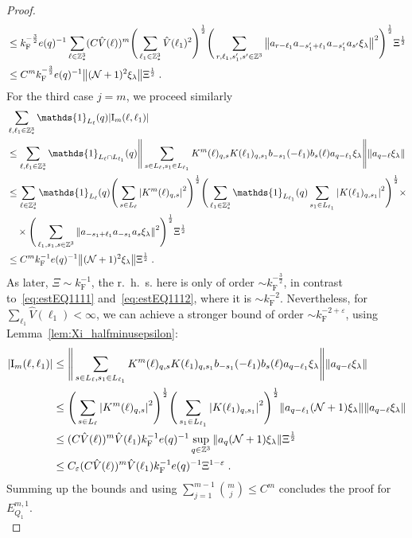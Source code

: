 \documentclass[12pt,a4paper]{article}
\numberwithin{equation}{section}
\newcommand{\1}{\mathbb{I}}
\newcommand{\F}{\mathrm{F}}
\newcommand{\I}{\mathrm{I}}
\newcommand{\Z}{\mathbb{Z}}
\newcommand{\NN}{\mathcal{N}}
\newcommand{\half}{\frac{1}{2}}
\theoremstyle{plain}
\theoremstyle{definition}
\theoremstyle{remark}
\theoremstyle{plain}
\theoremstyle{definition}
\theoremstyle{remark}
\begin{document}
\begin{proof}
\begin{align}
	&\leq k_{\F}^{-\frac 32} e(q)^{-1}
		\sum_{\ell \in \Z^3_*} (C \hat{V}(\ell))^m
		\Bigg( \sum_{\ell_1 \in \Z^3_*} \hat{V}(\ell_1)^2 \Bigg)^{\half} 
		\Bigg( \sum\limits_{r,\ell_1,s_1',s' \in \Z^3} \norm{a_{r-\ell_1} a_{-s_1'+\ell_1} a_{-s_1'} a_{s'} \xi_\lambda}^2 \Bigg)^\half
		\Xi^\half \nonumber\\
	&\leq C^m k_{\F}^{-\frac 32} e(q)^{-1}
		\norm{(\NN+1)^2 \xi_\lambda} \Xi^\half \;. \label{eq:estEQ1112}
\end{align}
For the third case $ j = m $, we proceed similarly
\begin{align}
	& \sum_{\ell,\ell_1 \in \Z^3_*} \mathds{1}_{L_\ell}(q) |\I_m(\ell, \ell_1)| \nonumber\\
	&\leq \sum_{\ell,\ell_1 \in \Z^3_*} \mathds{1}_{L_\ell \cap L_{\ell_1}}(q)
		\Bigg\Vert \sum\limits_{s\in L_{\ell}, s_1 \in L_{\ell_1}} K^m(\ell)_{q,s}K(\ell_1)_{q,s_1} b_{-s_1}(-\ell_1) b_{s}(\ell) a_{q-\ell_1}\xi_\lambda \Bigg\Vert
		\norm{ a_{q-\ell}\xi_\lambda }\nonumber\\
	&\leq \sum_{\ell \in \Z^3_*} \mathds{1}_{L_\ell}(q) \Bigg(\sum\limits_{s \in L_{\ell}} \abs{K^m(\ell)_{q,s}}^2\Bigg)^\half 
		\Bigg(\sum_{\ell_1 \in \Z^3_*} \mathds{1}_{L_{\ell_1}}(q) \sum\limits_{s_1 \in L_{\ell_1}} \abs{K(\ell_1)_{q,s_1}}^2\Bigg)^\half \times \nonumber\\
	&\quad \times \Bigg( \sum_{\ell_1, s_1, s \in \Z^3} \norm{ a_{-s_1+\ell_1} a_{-s_1} a_s \xi_\lambda}^2 \Bigg)^{\half} \Xi^\half \nonumber\\
	&\leq C^m k_{\F}^{-1} e(q)^{-1} \norm{ (\NN+1)^2 \xi_\lambda}\Xi^\half \;. \label{eq:estEQ1113_Coulomb}
\end{align}
As later, $ \Xi \sim k_{\F}^{-1} $, the r.~h.~s. here is only of order $ \sim k_{\F}^{-\frac 32} $, in contrast to~\eqref{eq:estEQ1111} and~\eqref{eq:estEQ1112}, where it is $ \sim k_{\F}^{-2} $. Nevertheless, for $ \sum_{\ell_1} \hat{V}(\ell_1) < \infty $, we can achieve a stronger bound of order $ \sim k_{\F}^{-2 + \varepsilon} $, using Lemma~\ref{lem:Xi_halfminusepsilon}:
\begin{align}
	|\I_m(\ell, \ell_1)|
	&\leq \Bigg\Vert \sum\limits_{s\in L_{\ell}, s_1 \in L_{\ell_1}} K^m(\ell)_{q,s}K(\ell_1)_{q,s_1} b_{-s_1}(-\ell_1) b_{s}(\ell) a_{q-\ell_1}\xi_\lambda \Bigg\Vert
		\norm{ a_{q-\ell}\xi_\lambda }\nonumber\\
	&\leq \Bigg(\sum\limits_{s \in L_{\ell}} \abs{K^m(\ell)_{q,s}}^2\Bigg)^\half \Bigg(\sum\limits_{s_1 \in L_{\ell_1}} \abs{K(\ell_1)_{q,s_1}}^2\Bigg)^\half \norm{ a_{q-\ell_1} (\NN+1)\xi_\lambda} \norm{ a_{q-\ell}\xi_\lambda }\nonumber\\
	&\leq (C \hat{V}(\ell))^m \hat{V}(\ell_1) k_{\F}^{-1} e(q)^{-1} \sup_{q \in \Z^3}\norm{ a_{q} (\NN+1) \xi_\lambda}\Xi^\half\nonumber\\
	&\leq C_\varepsilon (C \hat{V}(\ell))^m \hat{V}(\ell_1) k_{\F}^{-1} e(q)^{-1} \Xi^{1-\varepsilon} \;. \label{eq:estEQ1113}
\end{align}
Summing up the bounds and using $\sum_{j=1}^{m-1} {{m}\choose j} \le C^m $ concludes the proof for $ E^{m,1}_{Q_1} $.\\


\end{proof}
\end{document}
